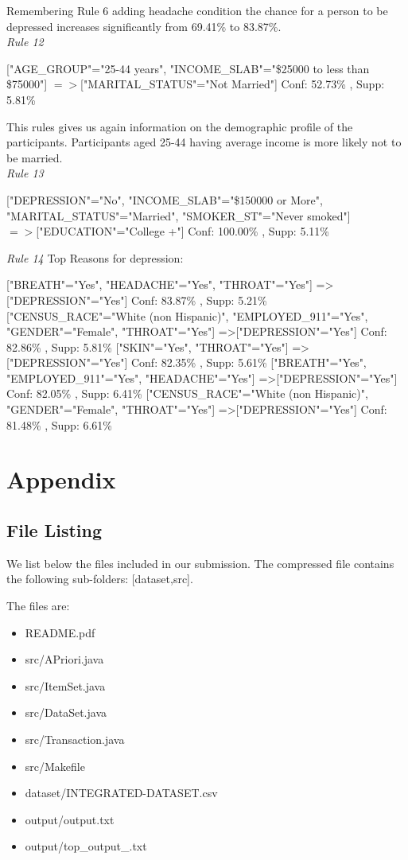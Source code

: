\documentclass[11pt]{article}
\begin{document}
Remembering Rule 6 adding headache condition the chance for a person to be depressed increases significantly from 69.41\% to 83.87\%. \\

\textit{Rule 12}

["AGE\_GROUP"="25-44 years", "INCOME\_SLAB"="\$25000 to less than \$75000"] $=>$["MARITAL\_STATUS"="Not Married"] Conf: 52.73\% , Supp: 5.81\% 

This rules gives us again information on the demographic profile of the participants. Participants aged 25-44 having average income is more likely
not to be married.\\

\textit{Rule 13}

["DEPRESSION"="No", "INCOME\_SLAB"="\$150000 or More", "MARITAL\_STATUS"="Married", "SMOKER\_ST"="Never smoked"] \\
$=>$["EDUCATION"="College +"] Conf: 100.00\% , Supp: 5.11\% 


\textit{Rule 14}
Top Reasons for depression:

["BREATH"="Yes", "HEADACHE"="Yes", "THROAT"="Yes"] =>["DEPRESSION"="Yes"] Conf: 83.87\% , Supp: 5.21\% 
["CENSUS_RACE"="White (non Hispanic)", "EMPLOYED_911"="Yes", "GENDER"="Female", "THROAT"="Yes"] =>["DEPRESSION"="Yes"] Conf: 82.86\% , Supp: 5.81\% 
["SKIN"="Yes", "THROAT"="Yes"] =>["DEPRESSION"="Yes"] Conf: 82.35\% , Supp: 5.61\% 
["BREATH"="Yes", "EMPLOYED_911"="Yes", "HEADACHE"="Yes"] =>["DEPRESSION"="Yes"] Conf: 82.05\% , Supp: 6.41\% 
["CENSUS_RACE"="White (non Hispanic)", "GENDER"="Female", "THROAT"="Yes"] =>["DEPRESSION"="Yes"] Conf: 81.48\% , Supp: 6.61\% 

\section* {Appendix}

\subsection* {File Listing}

We list below the files included in our submission. The compressed file contains the following sub-folders: [dataset,src].

The files are:
\begin{itemize}
\item README.pdf
\item src/APriori.java
\item src/ItemSet.java
\item src/DataSet.java
\item src/Transaction.java
\item src/Makefile
\item dataset/INTEGRATED-DATASET.csv
\item output/output.txt
\item output/top\_output\_.txt
\end{itemize}
\end{document}
